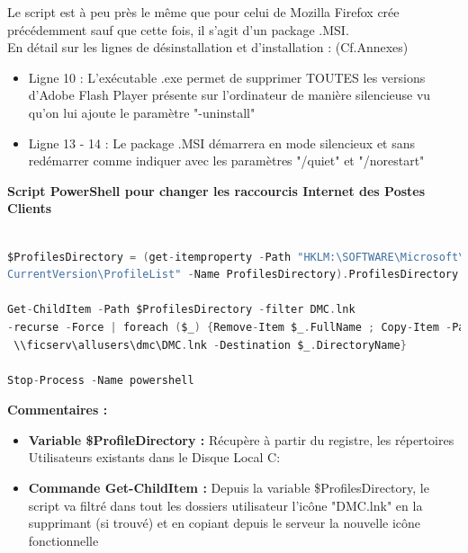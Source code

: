 \documentclass[11pt,a4paper,oneside]{article}
\begin{document}
Le script est à peu près le même que pour celui de Mozilla Firefox crée précédemment sauf que cette fois, il s'agit d'un package .MSI.\\
En détail sur les lignes de désinstallation et d'installation : (Cf.Annexes) \\
\begin{itemize}
\item Ligne 10 : L'exécutable .exe permet de supprimer TOUTES les versions d'Adobe Flash Player présente sur 			l'ordinateur de manière silencieuse vu qu'on lui ajoute le paramètre "-uninstall" \\

\item Ligne 13 - 14 : Le package .MSI démarrera en mode silencieux et sans redémarrer comme indiquer avec les paramètres "/quiet" et "/norestart"
\end{itemize}
\newpage
\textbf{Script PowerShell pour changer les raccourcis Internet des Postes Clients}

\begin{lstlisting}[language=C]

$ProfilesDirectory = (get-itemproperty -Path "HKLM:\SOFTWARE\Microsoft\Windows NT\
CurrentVersion\ProfileList" -Name ProfilesDirectory).ProfilesDirectory

Get-ChildItem -Path $ProfilesDirectory -filter DMC.lnk 
-recurse -Force | foreach ($_) {Remove-Item $_.FullName ; Copy-Item -Path
 \\ficserv\allusers\dmc\DMC.lnk -Destination $_.DirectoryName}

Stop-Process -Name powershell

\end{lstlisting}
\textbf{Commentaires :}\\
\begin{itemize}
\item \textbf{Variable \$ProfileDirectory :} Récupère à partir du registre, les répertoires Utilisateurs existants dans le Disque Local C: 
\item \textbf{Commande Get-ChildItem :} Depuis la variable \$ProfilesDirectory, le script va filtré dans tout les dossiers utilisateur l'icône "DMC.lnk" en la supprimant (si trouvé) et en copiant depuis le serveur la nouvelle icône fonctionnelle 
\end{itemize}
\end{document}
